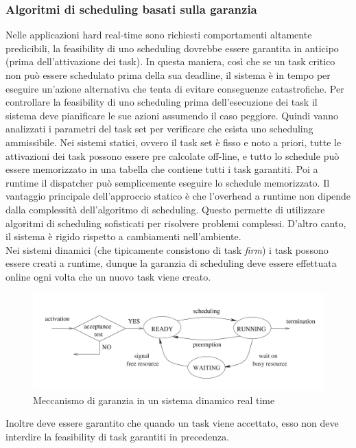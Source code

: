 \documentclass[12pt,openany,onesided]{book}
\begin{document}
\subsubsection{Algoritmi di scheduling basati sulla garanzia}
Nelle applicazioni hard real-time sono richiesti comportamenti altamente predicibili, la feasibility di uno scheduling dovrebbe essere garantita in anticipo (prima dell'attivazione dei task).
In questa maniera, così che se un task critico non può essere schedulato prima della sua deadline, il sistema è in tempo per eseguire un'azione alternativa che tenta di evitare conseguenze catastrofiche.
Per controllare la feasibility di uno scheduling prima dell'esecuzione dei task il sistema deve pianificare le sue azioni assumendo il caso peggiore.
Quindi vanno analizzati i parametri del task set per verificare che esista uno scheduling ammissibile.
Nei sistemi statici, ovvero il task set è fisso e noto a priori, tutte le attivazioni dei task possono essere pre calcolate off-line, e tutto lo schedule può essere memorizzato in una tabella che contiene tutti i task garantiti.
Poi a runtime il dispatcher può semplicemente eseguire lo schedule memorizzato. Il vantaggio principale dell'approccio statico è che l'overhead a runtime non dipende dalla complessità dell'algoritmo di scheduling.
Questo permette di utilizzare algoritmi di scheduling sofisticati per risolvere problemi complessi. D'altro canto, il sistema è rigido rispetto a cambiamenti nell'ambiente.\\
Nei sistemi dinamici (che tipicamente consistono di task \textit{firm}) i task possono essere creati a runtime, dunque la garanzia di scheduling deve essere effettuata online ogni volta che un nuovo task viene creato.
\begin{figure}[H]
    \centering
    \includegraphics[width=\textwidth]{pictures/garanziaDinamica.png}
    \caption{Meccanismo di garanzia in un sistema dinamico real time}
\end{figure}
\noindent Inoltre deve essere garantito che quando un task viene accettato, esso non deve interdire la feasibility di task garantiti in precedenza.
\end{document}
